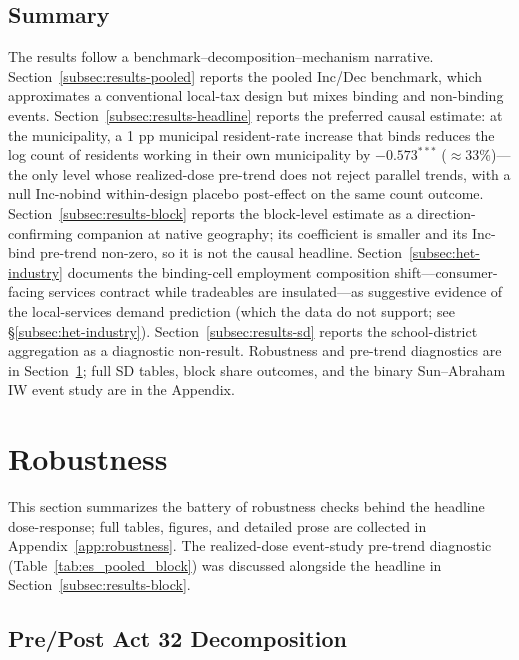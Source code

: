 \documentclass[12pt]{article}
\begin{document}
\subsection{Summary}
\label{subsec:results-summary}

The results follow a benchmark--decomposition--mechanism narrative.
Section~\ref{subsec:results-pooled} reports the pooled Inc/Dec
benchmark, which approximates a conventional local-tax design but
mixes binding and non-binding events.
Section~\ref{subsec:results-headline} reports the preferred causal
estimate: at the municipality, a 1 pp municipal resident-rate
increase that binds reduces the log count of residents working in
their own municipality by $-0.573^{***}$ ($\approx 33\%$)---the only
level whose realized-dose pre-trend does not reject parallel trends,
with a null Inc-nobind within-design placebo post-effect on the same
count outcome. Section~\ref{subsec:results-block} reports the
block-level estimate as a direction-confirming companion at native geography;
its coefficient is smaller and its Inc-bind pre-trend non-zero, so it is not
the causal headline. Section~\ref{subsec:het-industry} documents the
binding-cell employment composition shift---consumer-facing services
contract while tradeables are insulated---as suggestive evidence of
the local-services demand prediction (which the data do not support; see \S\ref{subsec:het-industry}).
Section~\ref{subsec:results-sd} reports the school-district
aggregation as a diagnostic non-result. Robustness and pre-trend
diagnostics are in Section~\ref{sec:robustness}; full SD tables,
block share outcomes, and the binary Sun--Abraham IW event study
are in the Appendix.

\section{Robustness}
\label{sec:robustness}

This section summarizes the battery of robustness checks behind the
headline dose-response; full tables, figures, and detailed prose are
collected in Appendix~\ref{app:robustness}. The realized-dose
event-study pre-trend diagnostic
(Table~\ref{tab:es_pooled_block}) was discussed alongside the
headline in Section~\ref{subsec:results-block}.

\subsection{Pre/Post Act 32 Decomposition}
\label{subsec:rob-act32}
\end{document}
